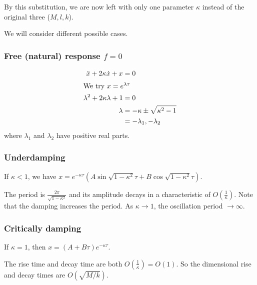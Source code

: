 \documentclass[a4paper]{article}
\begin{document}
By this substitution, we are now left with only one parameter $\kappa$ instead of the original three ($M, l, k$).

We will consider different possible cases.

\subsubsection*{Free (natural) response \texorpdfstring{$f = 0$}{f = 0}}
\begin{align*}
  \ddot x + 2\kappa \dot x + x &= 0\\
  \intertext{We try $x = e^{\lambda \tau}$}
  \lambda^2 + 2\kappa\lambda + 1 &= 0\\
  \lambda &= -\kappa \pm \sqrt{\kappa^2 - 1}\\
  &= -\lambda_1, -\lambda_2
\end{align*}
where $\lambda_1$ and $\lambda_2$ have positive real parts.

\subsubsection*{Underdamping}
If $\kappa < 1$, we have $x = e^{-\kappa\tau}(A\sin \sqrt{1 - \kappa^2}\tau +B\cos \sqrt{1 - \kappa^2}\tau)$.

The period is $\frac{2\pi}{\sqrt{1 - \kappa^2}}$ and its amplitude decays in a characteristic of $O(\frac{1}{\kappa})$. Note that the damping increases the period. As $\kappa \to 1$, the oscillation period $\to \infty$.
\begin{center}
\end{center}

\subsubsection*{Critically damping}
If $\kappa = 1$, then $x = (A + B\tau)e^{-\kappa\tau}$.

The rise time and decay time are both $O(\frac{1}{\kappa}) = O(1)$. So the dimensional rise and decay times are $O(\sqrt{M/k})$.
\begin{center}
\end{center}
\end{document}
